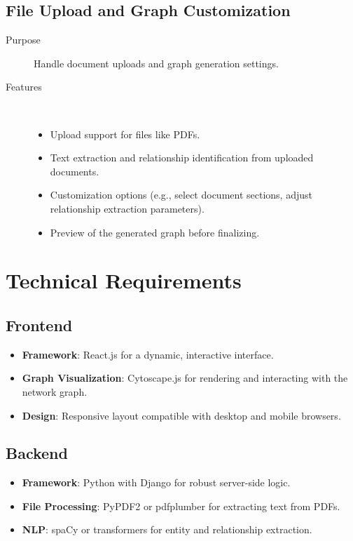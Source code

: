 \documentclass[%
 reprint,
 amsmath,amssymb,
 aps,
]{revtex4-2}
\begin{document}
\subsection{\label{sec:file_upload}File Upload and Graph Customization}
\begin{description}
\item[Purpose] Handle document uploads and graph generation settings.
\item[Features] ~
\begin{itemize}
\item Upload support for files like PDFs.
\item Text extraction and relationship identification from uploaded documents.
\item Customization options (e.g., select document sections, adjust relationship extraction parameters).
\item Preview of the generated graph before finalizing.
\end{itemize}
\end{description}

\section{\label{sec:technical_requirements}Technical Requirements}

\subsection{\label{sec:frontend}Frontend}
\begin{itemize}
\item \textbf{Framework}: React.js for a dynamic, interactive interface.
\item \textbf{Graph Visualization}: Cytoscape.js for rendering and interacting with the network graph.
\item \textbf{Design}: Responsive layout compatible with desktop and mobile browsers.
\end{itemize}

\subsection{\label{sec:backend}Backend}
\begin{itemize}
\item \textbf{Framework}: Python with Django for robust server-side logic.
\item \textbf{File Processing}: PyPDF2 or pdfplumber for extracting text from PDFs.
\item \textbf{NLP}: spaCy or transformers for entity and relationship extraction.
\end{itemize}
\end{document}
